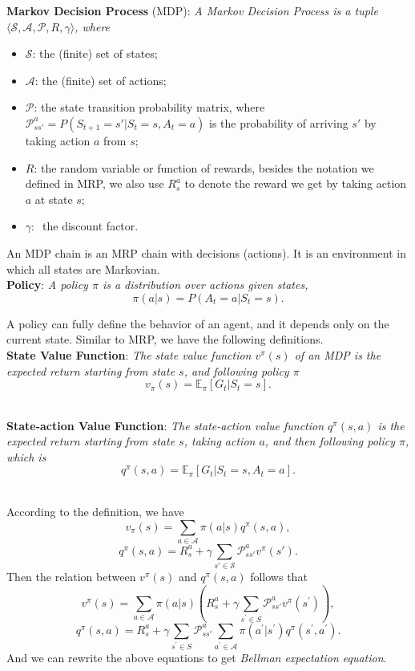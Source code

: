 \documentclass{progartcn}
\begin{document}
		\textbf{Markov Decision Process} (MDP): \textit{A Markov Decision Process is a tuple $\langle \mathcal{S, A, P}, R, \gamma\rangle$, where}
		\begin{itemize}[noitemsep,topsep=0pt]
			\item$\mathcal{S}$: the (finite) set of states;
			\item$\mathcal{A}$: the (finite) set of actions;
			\item$\mathcal{P}$: the state transition probability matrix, where $\mathcal{P}_{ss'}^a=P(S_{t+1}=s'|S_t=s, A_t=a)$ is the probability of arriving $s'$ by taking action $a$ from $s$;
			\item$R$: the random variable or function of rewards, besides the notation we defined in MRP, we also use $R_s^a$ to denote the reward we get by taking action $a$ at state $s$;
			\item$\gamma:\ $ the discount factor.
		\end{itemize}

		An MDP chain is an MRP chain with decisions (actions). It is an environment in which all states are Markovian.\\

		\textbf{Policy}: \textit{A policy $\pi$ is a distribution over actions given states,}
		\[\pi(a|s)=P(A_t=a|S_t=s).\]

		A policy can fully define the behavior of an agent, and it depends only on the current state. Similar to MRP, we have the following definitions.\\

		\textbf{State Value Function}: \textit{The state value function $v^\pi(s)$ of an MDP is the expected return starting from state $s$, and following policy $\pi$}
		\[v_\pi(s)=\mathbb{E}_\pi[G_t|S_t=s].\]\

		\textbf{State-action Value Function}: \textit{The state-action value function $q^\pi(s,a)$ is the expected return starting from state $s$, taking action $a$, and then following policy $\pi$, which is}
		\[q^\pi(s,a)=\mathbb{E}_\pi[G_t|S_t=s, A_t=a].\]\

		According to the definition, we have
		\[v_\pi(s)=\sum_{a\in \mathcal{A}}\pi(a|s)q^\pi(s,a),\]
		\[q^\pi(s,a)=R_s^a+\gamma\sum_{s'\in \mathcal{S}}\mathcal{P}_{ss'}^av^\pi(s').\]
		Then the relation between $v^\pi(s)$ and $q^\pi(s,a)$ follows that
		\[v^{\pi}(s) =\sum_{a \in \mathcal{A}} \pi(a | s)\left( R_s^a+\gamma \sum_{s^{\prime} \in S} \mathcal{P}_{ss'}^a v^{\pi}\left(s^{\prime}\right)\right),\]
		\[q^{\pi}(s, a) =R_s^a+\gamma \sum_{s^{\prime} \in S} \mathcal{P}_{ss'}^a \sum_{a^{\prime} \in \mathcal{A}} \pi\left(a^{\prime} | s^{\prime}\right) q^{\pi}\left(s^{\prime}, a^{\prime}\right).\]
		And we can rewrite the above equations to get \textit{Bellman expectation equation}.\\
\end{document}
